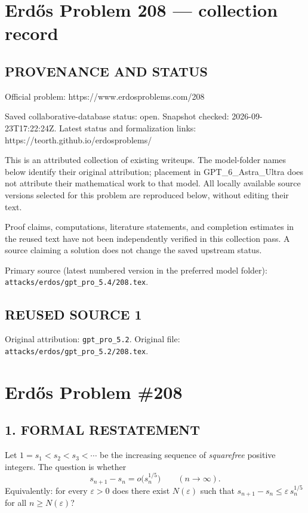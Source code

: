 \section*{Erd\H{o}s Problem 208 --- collection record}

\subsection*{PROVENANCE AND STATUS}
Official problem: https://www.erdosproblems.com/208

Saved collaborative-database status: open.
Snapshot checked: 2026-09-23T17:22:24Z.
Latest status and formalization links: https://teorth.github.io/erdosproblems/

This is an attributed collection of existing writeups. The model-folder names below identify their original attribution; placement in GPT\_6\_Astra\_Ultra does not attribute their mathematical work to that model. All locally available source versions selected for this problem are reproduced below, without editing their text.

Proof claims, computations, literature statements, and completion estimates in the reused text have not been independently verified in this collection pass. A source claiming a solution does not change the saved upstream status.

Primary source (latest numbered version in the preferred model folder): \texttt{attacks/erdos/gpt\_pro\_5.4/208.tex}.

\subsection*{REUSED SOURCE 1}
Original attribution: \texttt{gpt\_pro\_5.2}.
Original file: \texttt{attacks/erdos/gpt\_pro\_5.2/208.tex}.

\section*{Erd\H{o}s Problem \#208}

\subsection*{1. FORMAL RESTATEMENT}
Let $1=s_1<s_2<s_3<\cdots$ be the increasing sequence of \emph{squarefree} positive integers.
The question is whether
\[
 s_{n+1}-s_n = o\bigl(s_n^{1/5}\bigr)\qquad (n\to\infty).
\]
Equivalently: for every $\varepsilon>0$ does there exist $N(\varepsilon)$ such that
$s_{n+1}-s_n \le \varepsilon\, s_n^{1/5}$ for all $n\ge N(\varepsilon)$?


